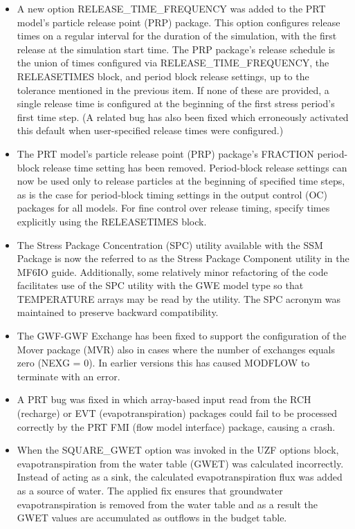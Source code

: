 \begin{itemize}
		\item A new option RELEASE\_TIME\_FREQUENCY was added to the PRT model's particle release point (PRP) package. This option configures release times on a regular interval for the duration of the simulation, with the first release at the simulation start time. The PRP package's release schedule is the union of times configured via RELEASE\_TIME\_FREQUENCY, the RELEASETIMES block, and period block release settings, up to the tolerance mentioned in the previous item. If none of these are provided, a single release time is configured at the beginning of the first stress period's first time step. (A related bug has also been fixed which erroneously activated this default when user-specified release times were configured.)
		\item The PRT model's particle release point (PRP) package's FRACTION period-block release time setting has been removed. Period-block release settings can now be used only to release particles at the beginning of specified time steps, as is the case for period-block timing settings in the output control (OC) packages for all models. For fine control over release timing, specify times explicitly using the RELEASETIMES block.
		\item The Stress Package Concentration (SPC) utility available with the SSM Package is now the referred to as the Stress Package Component utility in the MF6IO guide.  Additionally, some relatively minor refactoring of the code facilitates use of the SPC utility with the GWE model type so that TEMPERATURE arrays may be read by the utility.  The SPC acronym was maintained to preserve backward compatibility.
		\item The GWF-GWF Exchange has been fixed to support the configuration of the Mover package (MVR) also in cases where the number of exchanges equals zero (NEXG = 0). In earlier versions this has caused MODFLOW to terminate with an error.
		\item A PRT bug was fixed in which array-based input read from the RCH (recharge) or EVT (evapotranspiration) packages could fail to be processed correctly by the PRT FMI (flow model interface) package, causing a crash.
		\item When the SQUARE\_GWET option was invoked in the UZF options block, evapotranspiration from the water table (GWET) was calculated incorrectly.  Instead of acting as a sink, the calculated evapotranspiration flux was added as a source of water.  The applied fix ensures that groundwater evapotranspiration is removed from the water table and as a result the GWET values are accumulated as outflows in the budget table.

\end{itemize}
